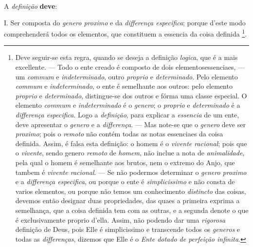 
 
A \emph{definição} \textbf{deve}:

I. Ser composta do \emph{genero proximo} e da \emph{differença especifica}; porque d'este modo comprehenderá todos os elementos, que constituem a essencia da coisa definida \footnote{Deve seguir-se esta regra, quando se deseja a definição \emph{logica}, que é a mais excellente. --- Todo o ente creado é composto de dois elementosessenciaes, --- um \emph{commum} e \emph{indeterminado}, outro \emph{proprio} e \emph{determinado}. Pelo elemento \emph{commum} e \emph{indeterminado}, o ente é semelhante aos outros: pelo elemento \emph{proprio} e \emph{determinado}, distingue-se dos outros e fórma uma classe especial. O elemento \emph{commum} e \emph{indeterminado} é o \emph{genero}; o \emph{proprio} e \emph{determinado} é a \emph{differença especifica}. Logo a \emph{definição}, para explicar a \emph{essencia} de um ente, deve apresentar o \emph{genero} e a \emph{differença}. --- Mas note-se que o \emph{genero} deve ser \emph{proximo}; pois o \emph{remoto} não contém todas as notas essenciaes da coisa definida. Assim, é falsa esta definição: o homem é o \emph{vivente racional}; pois que o \emph{vivente}, sendo genero \emph{remoto} de \emph{homem}, não inclue a nota de \emph{animalidade}, pela qual o homem é semelhante aos brutos, nem o extremo do Anjo, que tambem é \emph{vivente racional}. --- Se não podermos determinar o \emph{genero proximo} e a \emph{differença especifica}, ou porque o ente é \emph{simplicissimo} e não consta de varios elementos, ou porque não temos um conhecimento \emph{distincto} das coisas, devemos então designar duas propriedades, das quaes a primeira exprima a semelhança, que a coisa definida tem com as outras, e a segunda denote o que é exclusivamente proprio d'ella. Assim, não podendo dar uma \emph{rigorosa} definição de Deus, pois Elle é simplicissimo e transcende todos os \emph{generos} e todas as \emph{differenças}, dizemos que Elle é o \emph{Ente dotado de perfeição infinita}.}.

